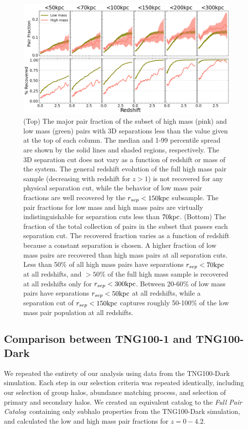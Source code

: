 \documentclass[twocolumn]{aastex631}
\newcommand{\paircat}{\textit{Full Pair Catalog}}
\begin{document}
    \begin{figure}[htp]
        \centering
        \includegraphics[width=\textwidth]{pairfrac_sepcut.png}
        \caption{%
        (Top) The major pair fraction of the subset of high mass (pink) and low mass (green) pairs with 3D separations less than the value given at the top of each column. 
        The median and 1-99 percentile spread are shown by the solid lines and shaded regions, respectively. 
        The 3D separation cut does not vary as a function of redshift or mass of the system. 
        The general redshift evolution of the full high mass pair sample (decreasing with redshift for $z>1$) is not recovered for any physical separation cut, while the behavior of low mass pair fractions are well recovered by the $r_{sep}<150\mathrm{kpc}$ subsample.
        The pair fractions for low mass and high mass pairs are virtually indistinguishable for separation cuts less than $70\mathrm{kpc}$. 
        (Bottom) The fraction of the total collection of pairs in the subset that passes each separation cut. 
        The recovered fraction varies as a function of redshift because a constant separation is chosen. 
        A higher fraction of low mass pairs are recovered than high mass pairs at all separation cuts. 
        Less than 50\% of all high mass pairs have separations $r_{sep}<70\mathrm{kpc}$ at all redshifts, and $>50\%$ of the full high mass sample is recovered at all redshifts only for $r_{sep}<300\mathrm{kpc}$. 
        Between 20-60\% of low mass pairs have separations $r_{sep}<50\mathrm{kpc}$ at all redshifts, while a separation cut of $r_{sep}<150\mathrm{kpc}$ captures roughly 50-100\% of the low mass pair population at all redshifts. 
        }
      \label{fig:sepcut}
    \end{figure}

    \subsection{Comparison between TNG100-1 and TNG100-Dark}\label{sec:disc-dark}
    We repeated the entirety of our analysis using data from the TNG100-Dark simulation.
    Each step in our selection criteria was repeated identically, including our selection of group halos, abundance matching process, and selection of primary and secondary halos.
    We created an equivalent catalog to the \paircat\ containing only subhalo properties from the TNG100-Dark simulation, and calculated the low and high mass pair fractions for $z=0-4.2$. 
\end{document}
